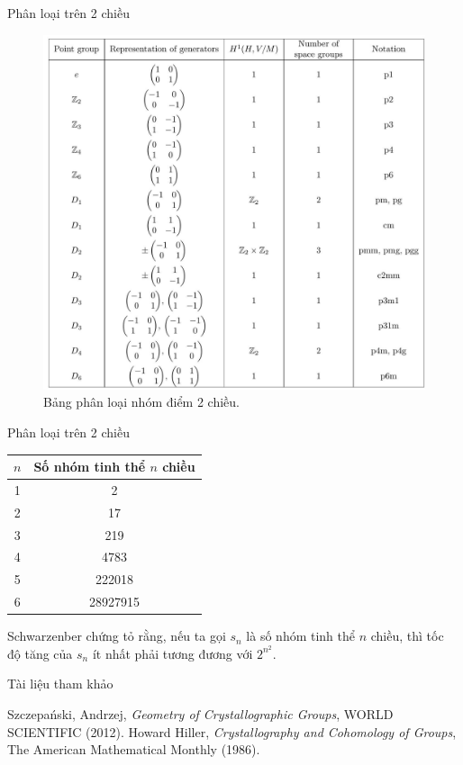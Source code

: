 \begin{frame}{Phân loại trên 2 chiều}
    \begin{figure}[ht]
        \centering
        \includegraphics[scale=0.15]{assets/point-group-table.jpg}
        \caption{Bảng phân loại nhóm điểm 2 chiều.}
        \label{fig:point-group-table}
    \end{figure}
\end{frame}

\begin{frame}{Phân loại trên 2 chiều}
    \begin{center}
    \begin{tabular}{ |c|c| } 
        \hline
        $n$ & Số nhóm tinh thể $n$ chiều\\
        \hline
        1 & 2\\
        2 & 17\\
        3 & 219\\
        4 & 4783\\
        5 & 222018\\
        6 & 28927915\\
        \hline
    \end{tabular}
    \end{center}
    Schwarzenber chứng tỏ rằng, nếu ta gọi $s_n$ là số nhóm tinh thể $n$ chiều, thì tốc độ tăng của $s_n$ ít nhất phải tương đương với $2^{n^2}$.
\end{frame}
    
\begin{frame}{Tài liệu tham khảo}
    \renewcommand\refname{Tài liệu tham khảo}
\begin{thebibliography}{9}
     Szczepański, Andrzej, \textit{Geometry of Crystallographic Groups}, WORLD SCIENTIFIC (2012).
     Howard Hiller, \textit{Crystallography and Cohomology of Groups}, The American Mathematical Monthly (1986).
\end{thebibliography}

\end{frame}


